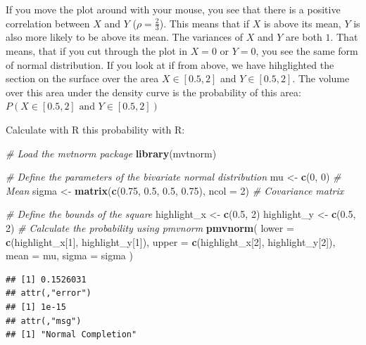 \documentclass[
]{book}
\newenvironment{Shaded}{\begin{snugshade}}{\end{snugshade}}
\newcommand{\AttributeTok}[1]{\textcolor[rgb]{0.13,0.29,0.53}{#1}}
\newcommand{\CommentTok}[1]{\textcolor[rgb]{0.56,0.35,0.01}{\textit{#1}}}
\newcommand{\DecValTok}[1]{\textcolor[rgb]{0.00,0.00,0.81}{#1}}
\newcommand{\FloatTok}[1]{\textcolor[rgb]{0.00,0.00,0.81}{#1}}
\newcommand{\FunctionTok}[1]{\textcolor[rgb]{0.13,0.29,0.53}{\textbf{#1}}}
\newcommand{\NormalTok}[1]{#1}
\newcommand{\OtherTok}[1]{\textcolor[rgb]{0.56,0.35,0.01}{#1}}
\begin{document}
If you move the plot around with your mouse, you see that there is a positive
correlation between \(X\) and \(Y\) (\(\rho = \frac{2}{3}\)). This means that if \(X\) is
above its mean, \(Y\) is also more likely to be above its mean.
The variances of \(X\) and \(Y\) are both \(1\). That means, that if you cut
through the plot in \(X=0\) or \(Y=0\), you see the same form of normal distribution.
If you look at if from above, we have hihglighted the section on the surface
over the area \(X \in [0.5, 2]\) and \(Y \in [0.5, 2]\). The volume over this area
under the density curve is the probability of this area: \(P(X \in [0.5, 2] \text{ and } Y \in [0.5, 2])\)

Calculate with R this probability with R:

\begin{Shaded}
\begin{Highlighting}[]
\CommentTok{\# Load the mvtnorm package}
\FunctionTok{library}\NormalTok{(mvtnorm)}

\CommentTok{\# Define the parameters of the bivariate normal distribution}
\NormalTok{mu }\OtherTok{\textless{}{-}} \FunctionTok{c}\NormalTok{(}\DecValTok{0}\NormalTok{, }\DecValTok{0}\NormalTok{)                       }\CommentTok{\# Mean}
\NormalTok{sigma }\OtherTok{\textless{}{-}} \FunctionTok{matrix}\NormalTok{(}\FunctionTok{c}\NormalTok{(}\FloatTok{0.75}\NormalTok{, }\FloatTok{0.5}\NormalTok{, }\FloatTok{0.5}\NormalTok{, }\FloatTok{0.75}\NormalTok{), }\AttributeTok{ncol =} \DecValTok{2}\NormalTok{) }\CommentTok{\# Covariance matrix}

\CommentTok{\# Define the bounds of the square}
\NormalTok{highlight\_x }\OtherTok{\textless{}{-}} \FunctionTok{c}\NormalTok{(}\FloatTok{0.5}\NormalTok{, }\DecValTok{2}\NormalTok{)}
\NormalTok{highlight\_y }\OtherTok{\textless{}{-}} \FunctionTok{c}\NormalTok{(}\FloatTok{0.5}\NormalTok{, }\DecValTok{2}\NormalTok{)}
\CommentTok{\# Calculate the probability using pmvnorm}
\FunctionTok{pmvnorm}\NormalTok{(}
  \AttributeTok{lower =} \FunctionTok{c}\NormalTok{(highlight\_x[}\DecValTok{1}\NormalTok{], highlight\_y[}\DecValTok{1}\NormalTok{]),}
  \AttributeTok{upper =} \FunctionTok{c}\NormalTok{(highlight\_x[}\DecValTok{2}\NormalTok{], highlight\_y[}\DecValTok{2}\NormalTok{]),}
  \AttributeTok{mean =}\NormalTok{ mu,}
  \AttributeTok{sigma =}\NormalTok{ sigma}
\NormalTok{)}
\end{Highlighting}
\end{Shaded}

\begin{verbatim}
## [1] 0.1526031
## attr(,"error")
## [1] 1e-15
## attr(,"msg")
## [1] "Normal Completion"
\end{verbatim}
\end{document}
